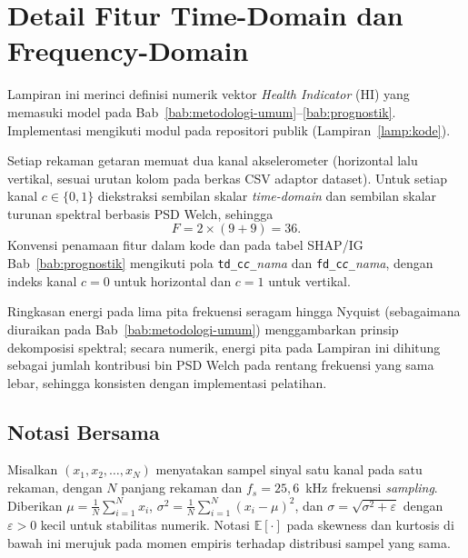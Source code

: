 ﻿%

\chapter{Detail Fitur Time-Domain dan Frequency-Domain}
\label{lamp:fitur}

Lampiran ini merinci definisi numerik vektor \emph{Health Indicator} (HI)
yang memasuki model pada Bab~\ref{bab:metodologi-umum}--\ref{bab:prognostik}.
Implementasi mengikuti modul  pada repositori
publik (Lampiran~\ref{lamp:kode}).

Setiap rekaman getaran memuat dua kanal akselerometer (horizontal lalu
vertikal, sesuai urutan kolom pada berkas CSV adaptor dataset).
Untuk setiap kanal $c \in \{0,1\}$ diekstraksi sembilan skalar
\emph{time-domain} dan sembilan skalar turunan spektral berbasis PSD
Welch, sehingga
\begin{equation}\label{eq:lampA_dim}
  F = 2 \times (9 + 9) = 36.
\end{equation}
\noindent Konvensi penamaan fitur dalam kode dan pada tabel SHAP/IG
Bab~\ref{bab:prognostik} mengikuti pola
\texttt{td\_c\textit{c}\_}\textit{nama} dan
\texttt{fd\_c\textit{c}\_}\textit{nama}, dengan indeks kanal
$c=0$ untuk horizontal dan $c=1$ untuk vertikal.

Ringkasan energi pada lima pita frekuensi seragam hingga Nyquist
(sebagaimana diuraikan pada Bab~\ref{bab:metodologi-umum})
menggambarkan prinsip dekomposisi spektral; secara numerik, energi pita
pada Lampiran ini dihitung sebagai jumlah kontribusi bin PSD Welch
pada rentang frekuensi yang sama lebar, sehingga konsisten dengan
implementasi pelatihan.

\section{Notasi Bersama}
\label{lamp:fitur_notasi}

Misalkan $(x_1, x_2, \ldots, x_N)$ menyatakan sampel sinyal satu kanal
pada satu rekaman, dengan $N$ panjang rekaman dan
$f_s = 25{,}6$~kHz frekuensi \emph{sampling}.
Diberikan $\mu = \frac{1}{N}\sum_{i=1}^{N} x_i$,
$\sigma^2 = \frac{1}{N}\sum_{i=1}^{N}(x_i - \mu)^2$,
dan $\sigma = \sqrt{\sigma^2 + \varepsilon}$ dengan
$\varepsilon > 0$ kecil untuk stabilitas numerik.
Notasi $\mathbb{E}[\cdot]$ pada skewness dan kurtosis di bawah ini
merujuk pada momen empiris terhadap distribusi sampel yang sama.

